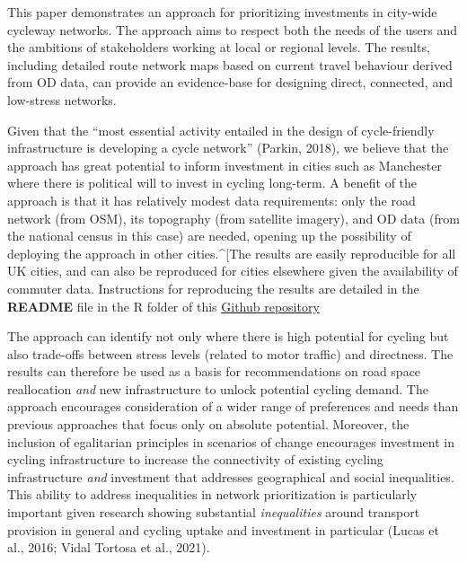 \documentclass[
]{article}
\begin{document}
This paper demonstrates an approach for prioritizing
investments in city-wide cycleway networks. The approach aims to respect
both the needs of the users and the ambitions of stakeholders working at
local or regional levels. The results, including detailed route network
maps based on current travel behaviour derived from OD data, can provide
an evidence-base for designing direct, connected,
and low-stress networks.

Given that the ``most essential activity entailed in the design of
cycle-friendly infrastructure is developing a cycle network''
(Parkin, 2018), we believe that the approach has great
potential to inform investment in cities such as Manchester where there
is political will to invest in cycling long-term. A benefit of the
approach is that it has relatively modest data requirements: only the
road network (from OSM), its topography (from satellite imagery), and
OD data (from the national census in this case) are
needed, opening up the possibility of deploying the approach in other
cities.\^{}{[}The results are easily reproducible for all UK cities, and can also be reproduced for cities elsewhere given the availability of commuter data. Instructions for reproducing the results are detailed in the \textbf{README} file in the R folder of this \href{https://github.com/Hussein-Mahfouz/cycle-networks}{Github repository}

The approach can identify not only where there is high
potential for cycling but also trade-offs between
stress levels (related to motor traffic) and directness.
The results can therefore be used as a basis for recommendations on
road space reallocation \emph{and} new infrastructure to unlock potential cycling demand.
The approach encourages consideration of a wider range of preferences
and needs than previous approaches that focus only on absolute potential.
Moreover, the inclusion of egalitarian principles in scenarios of change
encourages investment in cycling infrastructure to
increase the connectivity of existing cycling infrastructure
\emph{and} investment that addresses geographical and social inequalities.
This ability to address inequalities in network prioritization is particularly
important given research showing substantial \emph{inequalities}
around transport provision in general and cycling uptake and investment
in particular (Lucas et al., 2016; Vidal Tortosa et al., 2021).
\end{document}

